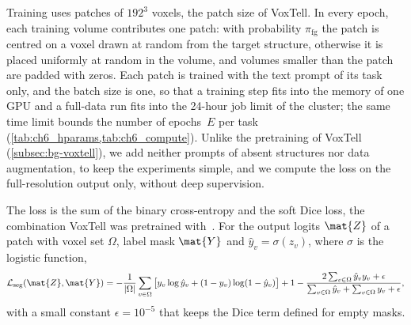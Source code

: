 Training uses patches of $192^3$ voxels, the patch size of VoxTell.
In every epoch, each training volume contributes one patch: with probability $\pi_{\mathrm{fg}}$ the patch is centred on a voxel drawn at random from the target structure, otherwise it is placed uniformly at random in the volume, and volumes smaller than the patch are padded with zeros.
Each patch is trained with the text prompt of its task only, and the batch size is one, so that a training step fits into the memory of one GPU and a full-data run fits into the 24-hour job limit of the cluster; the same time limit bounds the number of epochs~$E$ per task (\cref{tab:ch6_hparams,tab:ch6_compute}).
Unlike the pretraining of VoxTell (\cref{subsec:bg-voxtell}), we add neither prompts of absent structures nor data augmentation, to keep the experiments simple, and we compute the loss on the full-resolution output only, without deep supervision.

The loss is the sum of the binary cross-entropy and the soft Dice loss, the combination VoxTell was pretrained with~\cite{rokuss2025voxtellfreetextpromptableuniversal}.
For the output logits $\mat{Z}$ of a patch with voxel set $\Omega$, label mask $\mat{Y}$ and $\hat{y}_v = \sigma(z_v)$, where $\sigma$ is the logistic function,
\begin{equation}
\mathcal{L}_{\mathrm{seg}}(\mat{Z}, \mat{Y}) =
-\frac{1}{|\Omega|} \sum_{v \in \Omega} \big[ y_v \log \hat{y}_v + (1 - y_v) \log(1 - \hat{y}_v) \big]
+ 1 - \frac{2 \sum_{v \in \Omega} \hat{y}_v y_v + \epsilon}{\sum_{v \in \Omega} \hat{y}_v + \sum_{v \in \Omega} y_v + \epsilon},
\label{eq:method-seg-loss}
\end{equation}
with a small constant $\epsilon = 10^{-5}$ that keeps the Dice term defined for empty masks.

